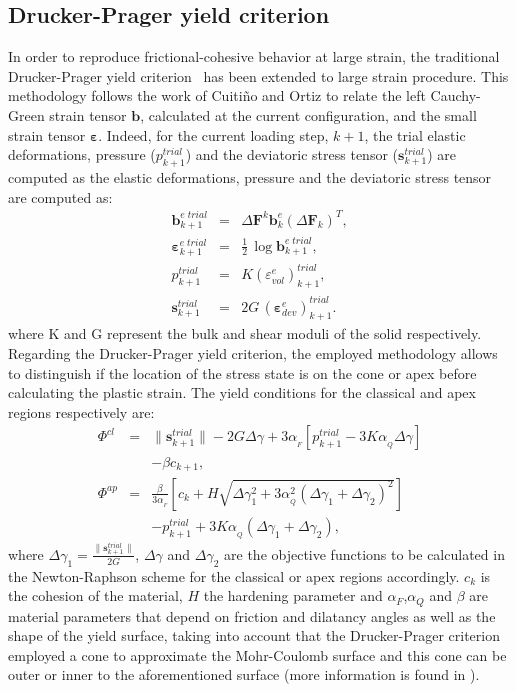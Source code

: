 \documentclass[twocolumn]{svjour3}          %
\begin{document}
\subsection{Drucker-Prager yield criterion}
\label{subsec:32}
In order to reproduce frictional-cohesive behavior at large strain, the traditional Drucker-Prager yield criterion~\cite{Sanavia:02,Sanavia:06} has been extended to large strain procedure. This methodology follows the work of Cuiti\~no and Ortiz \cite{cuitino:92} to relate the left Cauchy-Green strain tensor $\mathbf{b}$, calculated at the current configuration, and the small strain tensor $\boldsymbol{\varepsilon}$. Indeed, for the current loading step, $k+1$, 
the trial elastic deformations, pressure ($p^{trial}_{k+1}$)  and the deviatoric stress tensor ($\mathbf{s}^{trial}_{k+1} $) are computed as the elastic deformations, pressure  and the deviatoric stress tensor are computed as:
\begin{eqnarray}
\label{eq_dp1}
\mathbf{b}^{e\;trial}_{k+1} &=& \Delta\mathbf{F}^{k}\mathbf{b}^e_{k}(\Delta\mathbf{F}_{k})^{T}, \\
 \label{eq_dp2}
\boldsymbol{\varepsilon}^{e\; trial}_{k+1} &=& \frac{1}{2}\,\log\mathbf{b}^{e\; trial}_{k+1},
\\ \label{eq_dp3}
p^{trial}_{k+1} &=& K \left(\varepsilon^{e}_{vol}\right)^{trial}_{k+1},
\\ \label{eq_dp4}
\mathbf{s}^{trial}_{k+1} &=& 2G\,\left(\boldsymbol{\varepsilon}^{e}_{dev}\right)^{trial}_{k+1}.
\end{eqnarray}
where K and G represent the bulk and shear moduli of the solid respectively. Regarding the Drucker-Prager yield criterion, the employed methodology allows to distinguish if the location of the stress  state is on the cone or apex before calculating the plastic strain. The yield conditions for the classical and apex regions respectively are:
\begin{eqnarray}
\Phi^{cl} &=&\|\textbf{s}^{trial}_{k+1}\| - 2G\Delta\gamma + 3\alpha_{_F}[p^{trial}_{k+1}- 3K\alpha_{_Q}\Delta\gamma]
\nonumber\\\label{eq_dp9}
&&-\beta c_{k+1}, \\
\Phi^{ap}&=&\frac{\beta}{3\alpha_{_F}}\left[c_k+H\sqrt{\Delta\gamma_1^2 + 3\alpha_{_Q}^2(\Delta\gamma_1+\Delta\gamma_2)^2} \right]
\nonumber\\\label{eq_dp10}
&&- p^{trial}_{k+1}  
+3K\alpha_{_Q}\left(\Delta\gamma_1+\Delta\gamma_2 \right),
\end{eqnarray}
where $\Delta\gamma_1=\frac{\|\textbf{s}^{trial}_{k+1}\|}{2G}$, $\Delta\gamma$ and $\Delta\gamma_2$ are the objective functions to be calculated in the Newton-Raphson scheme for the classical or apex regions accordingly. $c_k$ is the cohesion of the material, $H$ the hardening parameter and $\alpha_F$,$\alpha_Q$ and $\beta$ are material parameters that depend on friction and dilatancy angles as well as the shape of the yield surface, taking into account that the Drucker-Prager criterion employed a cone to approximate the Mohr-Coulomb surface and this cone can be outer or inner to the aforementioned surface (more information is found in \cite{Navas:17b}).
\end{document}

